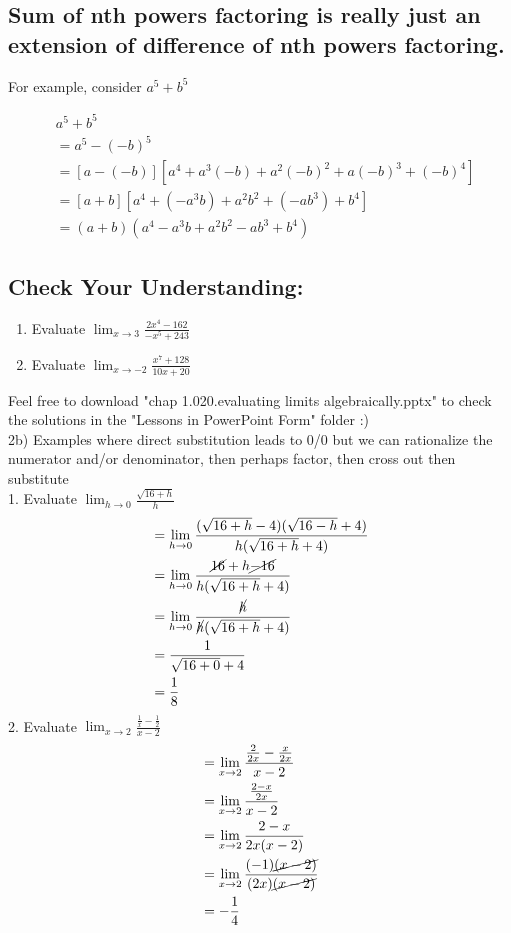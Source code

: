\documentclass{article}
\begin{document}
\subsection*{Sum of nth powers factoring is really just an extension of difference of nth powers factoring.}
For example, consider $a^5+b^5$

$$
\begin{aligned}
& a^5+b^5 \\
& =a^5-(-b)^5 \\
& =[a-(-b)]\left[a^4+a^3(-b)+a^2(-b)^2+a(-b)^3+(-b)^4\right] \\
& =[a+b]\left[a^4+\left(-a^3 b\right)+a^2 b^2+\left(-a b^3\right)+b^4\right] \\
& =(a+b)\left(a^4-a^3 b+a^2 b^2-a b^3+b^4\right)
\end{aligned}
$$ 
\subsection*{Check Your Understanding:}
\begin{enumerate}
    \item Evaluate $\lim_{x \to 3}\frac{2x^4-162}{-x^5+243}$
    \item Evaluate $\lim_{x \to -2}\frac{x^7+128}{10x+20}$ 
\end{enumerate}
Feel free to download "chap 1.020.evaluating limits algebraically.pptx" to check the solutions in the "Lessons in PowerPoint Form" folder :) \\

 2b)  Examples where direct substitution leads to 0/0 but we can rationalize the numerator and/or denominator, then perhaps factor, then cross out then substitute\\

 1. Evaluate $\lim_{h\to 0}\frac{\sqrt{16+h}}{h}$
 \begin{align*}
     &=\lim_{h\to 0}\frac{(\sqrt{16+h}-4)(\sqrt{16-h}+4)}{h(\sqrt{16+h}+4)}\\
     &=\lim_{h\to 0}\frac{\cancel{16}+h\cancel{-16}}{h(\sqrt{16+h}+4)}\\
     &=\lim_{h\to 0}\frac{\cancel{h}}{\cancel{h}(\sqrt{16+h}+4)}\\
     &=\frac{1}{\sqrt{16+0}+4}\\
     &=\frac{1}{8}
 \end{align*}
2. Evaluate $\lim_{x \to 2}\frac{\frac{1}{x}-\frac{1}{2}}{x-2}$
\begin{align*}
    &=\lim_{x \to 2}\frac{\frac{2}{2x}-\frac{x}{2x}}{x-2}\\
    &=\lim_{x \to 2}\frac{\frac{2-x}{2x}}{x-2}\\
    &=\lim_{x \to 2}\frac{2-x}{2x(x-2)}\\
    &=\lim_{x \to 2}\frac{(-1)\cancel{(x-2)}}{(2x)\cancel{(x-2)}}\\
    &=-\frac{1}{4}
\end{align*}
\end{document}
